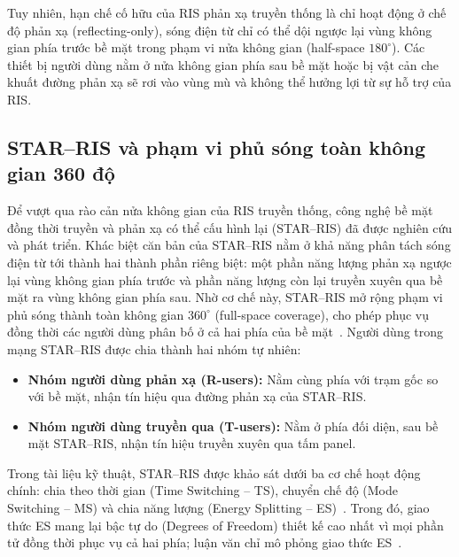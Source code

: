 Tuy nhiên, hạn chế cố hữu của RIS phản xạ truyền thống là chỉ hoạt động ở chế độ phản xạ
(reflecting-only), sóng điện từ chỉ có thể dội ngược lại vùng không gian phía trước bề mặt trong phạm vi
nửa không gian (half-space $180^\circ$). Các thiết bị người dùng nằm ở nửa không gian phía sau bề mặt hoặc
bị vật cản che khuất đường phản xạ sẽ rơi vào vùng mù và không thể hưởng lợi từ sự hỗ trợ của RIS.

\subsection{STAR--RIS và phạm vi phủ sóng toàn không gian 360 độ}
\label{ssec:star-ris}


Để vượt qua rào cản nửa không gian của RIS truyền thống, công nghệ bề mặt đồng thời truyền và phản xạ có
thể cấu hình lại (STAR--RIS) đã được nghiên cứu và phát triển. Khác biệt căn bản của STAR--RIS nằm ở khả
năng phân tách sóng điện từ tới thành hai thành phần riêng biệt: một phần năng lượng phản xạ ngược lại
vùng không gian phía trước và phần năng lượng còn lại truyền xuyên qua bề mặt ra vùng không gian phía sau.
Nhờ cơ chế này, STAR--RIS mở rộng phạm vi phủ sóng thành toàn không gian $360^\circ$ (full-space
coverage), cho phép phục vụ đồng thời các người dùng phân bố ở cả hai phía của bề mặt~\cite{Xu2021STARRIS,
Khalid2022STARDesign}. Người dùng trong mạng STAR--RIS được chia thành hai nhóm tự nhiên:
\begin{itemize}
\item \textbf{Nhóm người dùng phản xạ (R-users):} Nằm cùng phía với trạm gốc so với bề mặt, nhận tín hiệu
  qua đường phản xạ của STAR--RIS.
\item \textbf{Nhóm người dùng truyền qua (T-users):} Nằm ở phía đối diện, sau bề mặt STAR--RIS, nhận tín
  hiệu truyền xuyên qua tấm panel.
\end{itemize}

Trong tài liệu kỹ thuật, STAR--RIS được khảo sát dưới ba cơ chế hoạt động chính: chia theo thời gian (Time
Switching -- TS), chuyển chế độ (Mode Switching -- MS) và chia năng lượng (Energy Splitting --
ES)~\cite{Mu2021STARAided}. Trong đó, giao thức ES mang lại bậc tự do (Degrees of Freedom) thiết kế cao
nhất vì mọi phần tử đồng thời phục vụ cả hai phía; luận văn chỉ mô phỏng giao thức
ES~\cite{Mu2021STARAided, Liu2021STARCoupledPhase, Wang2022STAROptimization}.

